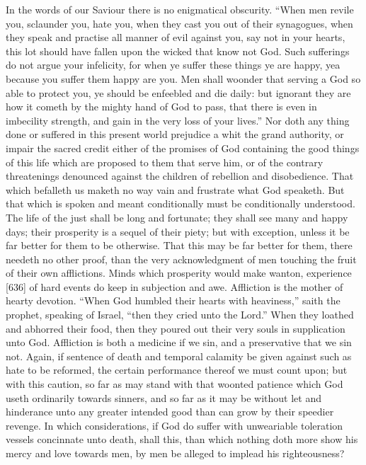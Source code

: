 In the words of our Saviour there is no enigmatical obscurity. “When men revile you, sclaunder you, hate you, when they cast you out of their synagogues, when they speak and practise all manner of evil against you, say not in your hearts, this lot should have fallen upon the wicked that know not God. Such sufferings do not argue your infelicity, for when ye suffer these things ye are happy, yea because you suffer them happy are you. Men shall woonder that serving a God so able to protect you, ye should be enfeebled and die daily: but ignorant they are how it cometh by the mighty hand of God to pass, that there is even in imbecility strength, and gain in the very loss of your lives.” Nor doth any thing done or suffered in this present world prejudice a whit the grand authority, or impair the sacred credit either of the promises of God containing the good things of this life which are proposed to them that serve him, or of the contrary threatenings denounced against the children of rebellion and disobedience. That which befalleth us maketh no way vain and frustrate what God speaketh. But that which is spoken and meant conditionally must be conditionally understood. The life of the just shall be long and fortunate; they shall see many and happy days; their prosperity is a sequel of their piety; but with exception, unless it be far better for them to be otherwise. That this may be far better for them, there needeth no other proof, than the very acknowledgment of men touching the fruit of their own afflictions. Minds which prosperity would make wanton, experience [636] of hard events do keep in subjection and awe. Affliction is the mother of hearty devotion. “When God humbled their hearts with heaviness,” saith the prophet, speaking of Israel, “then they cried unto the Lord.” When they loathed and abhorred their food, then they poured out their very souls in supplication unto God. Affliction is both a medicine if we sin, and a preservative that we sin not. Again, if sentence of death and temporal calamity be given against such as hate to be reformed, the certain performance thereof we must count upon; but with this caution, so far as may stand with that woonted patience which God useth ordinarily towards sinners, and so far as it may be without let and hinderance unto any greater intended good than can grow by their speedier revenge. In which considerations, if God do suffer with unweariable toleration vessels concinnate unto death, shall this, than which nothing doth more show his mercy and love towards men, by men be alleged to implead his righteousness?

